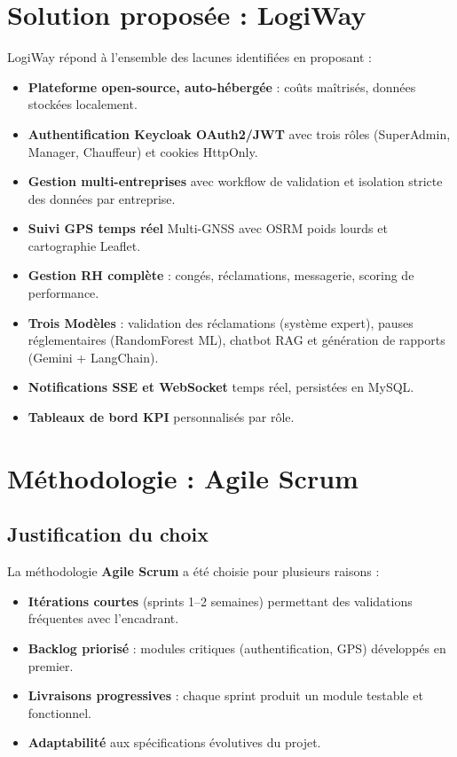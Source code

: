 \documentclass[12pt,a4paper]{report}
\begin{document}
\section{Solution proposée : LogiWay}
\label{sec:ch1-solution}

LogiWay répond à l'ensemble des lacunes identifiées en proposant :

\begin{itemize}
  \item \textbf{Plateforme open-source, auto-hébergée} : coûts maîtrisés,
        données stockées localement.
  \item \textbf{Authentification Keycloak OAuth2/JWT} avec trois rôles
        (SuperAdmin, Manager, Chauffeur) et cookies HttpOnly.
  \item \textbf{Gestion multi-entreprises} avec workflow de validation et
        isolation stricte des données par entreprise.
  \item \textbf{Suivi GPS temps réel} Multi-GNSS avec OSRM poids lourds
        et cartographie Leaflet.
  \item \textbf{Gestion RH complète} : congés, réclamations, messagerie,
        scoring de performance.
  \item \textbf{Trois Modèles} : validation des réclamations
        (système expert), pauses réglementaires (RandomForest ML),
        chatbot RAG et génération de rapports (Gemini + LangChain).
  \item \textbf{Notifications SSE et WebSocket} temps réel, persistées
        en MySQL.
  \item \textbf{Tableaux de bord KPI} personnalisés par rôle.
\end{itemize}

\section{Méthodologie : Agile Scrum}
\label{sec:ch1-methodologie}

\subsection{Justification du choix}

La méthodologie \textbf{Agile Scrum} a été choisie pour plusieurs raisons :

\begin{itemize}
  \item \textbf{Itérations courtes} (sprints 1--2 semaines) permettant des
        validations fréquentes avec l'encadrant.
  \item \textbf{Backlog priorisé} : modules critiques (authentification,
        GPS) développés en premier.
  \item \textbf{Livraisons progressives} : chaque sprint produit un module
        testable et fonctionnel.
  \item \textbf{Adaptabilité} aux spécifications évolutives du projet.
\end{itemize}
\end{document}
